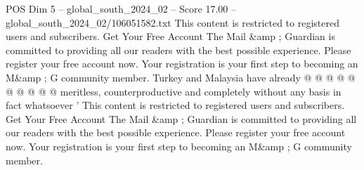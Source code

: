 \begin{textsample}{POS Dim 5 – global\_south\_2024\_02 – Score 17.00 – global\_south\_2024\_02/106051582.txt}
This content is restricted to registered users and subscribers.
Get Your Free Account The Mail \&amp ; Guardian is committed to providing all our readers with the best possible experience.
Please register your free account now.
Your registration is your first step to becoming an M\&amp ; G community member.
Turkey and Malaysia have already @ @ @ @ @ @ @ @ @ @ meritless, counterproductive and completely without any basis in fact whatsoever ' This content is restricted to registered users and subscribers.
Get Your Free Account The Mail \&amp ; Guardian is committed to providing all our readers with the best possible experience.
Please register your free account now.
Your registration is your first step to becoming an M\&amp ; G community member.

\end{textsample}
